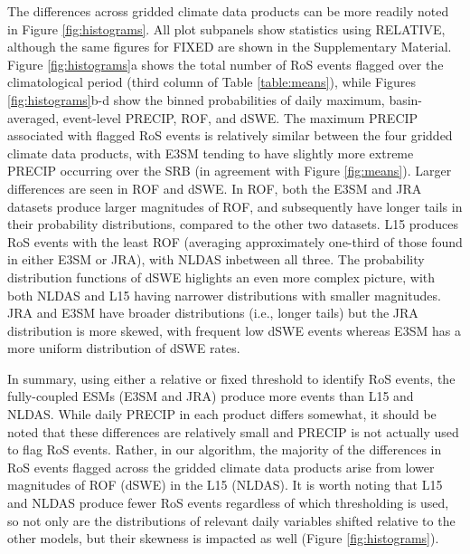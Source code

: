 \documentclass[draft]{agujournal2019}
\begin{document}
The differences across gridded climate data products can be more readily noted in Figure \ref{fig:histograms}. 
All plot subpanels show statistics using RELATIVE, although the same figures for FIXED are shown in the Supplementary Material. 
Figure \ref{fig:histograms}a shows the total number of RoS events flagged over the climatological period (third column of Table \ref{table:means}), while Figures \ref{fig:histograms}b-d show the binned probabilities of daily maximum, basin-averaged, event-level PRECIP, ROF, and dSWE. 
The maximum PRECIP associated with flagged RoS events is relatively similar between the four gridded climate data products, with E3SM tending to have slightly more extreme PRECIP occurring over the SRB (in agreement with Figure \ref{fig:means}). 
Larger differences are seen in ROF and dSWE. 
In ROF, both the E3SM and JRA datasets produce larger magnitudes of ROF, and subsequently have longer tails in their probability distributions, compared to the other two datasets. 
L15 produces RoS events with the least ROF (averaging approximately one-third of those found in either E3SM or JRA), with NLDAS inbetween all three. 
The probability distribution functions of dSWE higlights an even more complex picture, with both NLDAS and L15 having narrower distributions with smaller magnitudes. 
JRA and E3SM have broader distributions (i.e., longer tails) but the JRA distribution is more skewed, with frequent low dSWE events whereas E3SM has a more uniform distribution of dSWE rates.

In summary, using either a relative or fixed threshold to identify RoS events, the fully-coupled ESMs (E3SM and JRA) produce more events than L15 and NLDAS.
While daily PRECIP in each product differs somewhat, it should be noted that these differences are relatively small and PRECIP is not actually used to flag RoS events.
Rather, in our algorithm, the majority of the differences in RoS events flagged across the gridded climate data products arise from lower magnitudes of ROF (dSWE) in the L15 (NLDAS). 
It is worth noting that L15 and NLDAS produce fewer RoS events regardless of which thresholding is used, so not only are the distributions of relevant daily variables shifted relative to the other models, but their skewness is impacted as well (Figure \ref{fig:histograms}).
\end{document}
